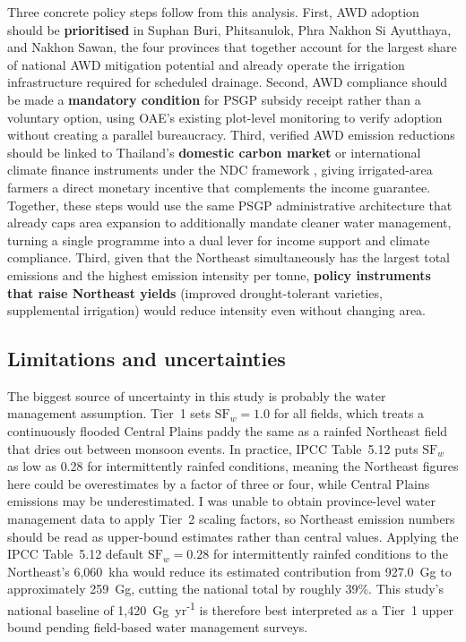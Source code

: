 \documentclass[fleqn,10pt]{olplainarticle}
\begin{document}
Three concrete policy steps follow from this analysis.
First, AWD adoption should be \textbf{prioritised} in Suphan Buri, Phitsanulok,
Phra Nakhon Si Ayutthaya, and Nakhon Sawan, the four provinces that together
account for the largest share of national AWD mitigation potential and already
operate the irrigation infrastructure required for scheduled drainage.
Second, AWD compliance should be made a \textbf{mandatory condition} for
PSGP subsidy receipt rather than a voluntary option, using OAE's existing
plot-level monitoring to verify adoption without creating a parallel
bureaucracy.
Third, verified AWD emission reductions should be linked to Thailand's
\textbf{domestic carbon market} or international climate finance instruments
under the NDC framework \citep{thailand_ndc2022}, giving irrigated-area
farmers a direct monetary incentive that complements the income guarantee.
Together, these steps would use the same PSGP administrative architecture
that already caps area expansion to additionally mandate cleaner water
management, turning a single programme into a dual lever for income support
and climate compliance.
Third, given that the Northeast simultaneously has the largest total emissions
and the highest emission intensity per tonne, \textbf{policy instruments that raise Northeast yields}
(improved drought-tolerant varieties, supplemental irrigation)
would reduce intensity even without changing area.

\subsection*{Limitations and uncertainties}

The biggest source of uncertainty in this study is probably the water management
assumption.
Tier~1 sets $\text{SF}_w = 1.0$ for all fields, which treats a continuously
flooded Central Plains paddy the same as a rainfed Northeast field that dries
out between monsoon events.
In practice, IPCC Table~5.12 puts $\text{SF}_w$ as low as 0.28 for
intermittently rainfed conditions, meaning the Northeast figures here could be
overestimates by a factor of three or four, while Central Plains emissions may
be underestimated.
I was unable to obtain province-level water management data to apply Tier~2
scaling factors, so Northeast emission numbers should be read as upper-bound
estimates rather than central values.
Applying the IPCC Table~5.12 default $\text{SF}_w = 0.28$ for intermittently
rainfed conditions to the Northeast's 6,060~kha would reduce its estimated
contribution from 927.0~Gg to approximately 259~Gg, cutting the national
total by roughly 39\%.
This study's national baseline of 1,420~Gg~yr\textsuperscript{-1} is therefore
best interpreted as a Tier~1 upper bound pending field-based water management
surveys.
\end{document}
